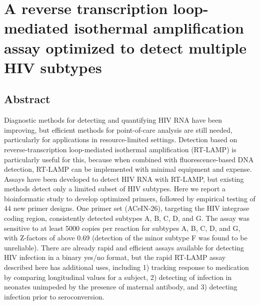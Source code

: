 \documentclass[../sherrill-Mix_thesis.tex]{subfiles}
\begin{document}
\graphicspath{{im/}{lamp/im/}}

\chapter{A reverse transcription loop-mediated isothermal amplification assay optimized to detect multiple HIV subtypes}

\label{chapLamp}



\section{Abstract}

	Diagnostic methods for detecting and quantifying HIV RNA have been improving, but efficient methods for point-of-care analysis are still needed, particularly for applications in resource-limited settings. Detection based on reverse-transcription loop-mediated isothermal amplification (RT-LAMP) is particularly useful for this, because when combined with fluorescence-based DNA detection, RT-LAMP can be implemented with minimal equipment and expense. Assays have been developed to detect HIV RNA with RT-LAMP, but existing methods detect only a limited subset of HIV subtypes. Here we report a bioinformatic study to develop optimized primers, followed by empirical testing of 44 new primer designs. One primer set (ACeIN-26), targeting the HIV integrase coding region, consistently detected subtypes A, B, C, D, and G. The assay was sensitive to at least 5000 copies per reaction for subtypes A, B, C, D, and G, with Z-factors of above 0.69 (detection of the minor subtype F was found to be unreliable). There are already rapid and efficient assays available for detecting HIV infection in a binary yes/no format, but the rapid RT-LAMP assay described here has additional uses, including 1) tracking response to medication by comparing longitudinal values for a subject, 2) detecting of infection in neonates unimpeded by the presence of maternal antibody, and 3) detecting infection prior to seroconversion.
\end{document}
